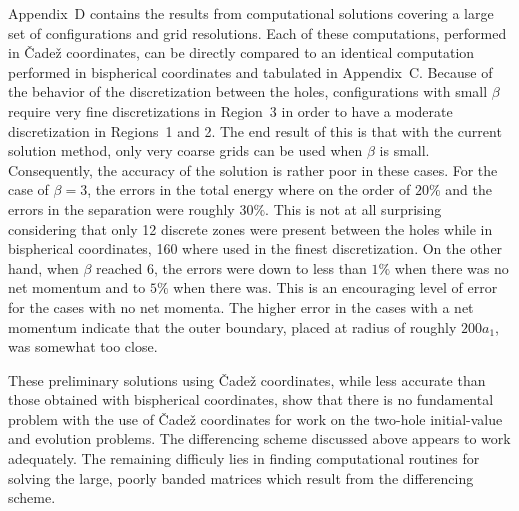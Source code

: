Appendix~D contains the results from computational solutions covering a large set
of configurations and grid resolutions.  Each of these computations, performed in
\v{C}ade\v{z} coordinates, can be directly compared to an identical computation
performed in bispherical coordinates and tabulated in Appendix~C.  Because of
the behavior of the discretization between the holes, configurations with small
$\beta$ require very fine discretizations in Region~3 in order to have a
moderate discretization in Regions~1 and 2.  The end result of this is that
with the current solution method, only very coarse grids can be used when
$\beta$ is small.  Consequently, the accuracy of the solution is rather poor in
these cases.  For the case of $\beta=3$, the errors in the total energy where
on the order of $20\%$ and the errors in the separation were roughly $30\%$. 
This is not at all surprising considering that only 12 discrete zones were
present between the holes while in bispherical coordinates, 160 where used in
the finest discretization.  On the other hand, when $\beta$ reached 6, the errors
were down to less than $1\%$ when there was no net momentum and to $5\%$ when
there was.  This is an encouraging level of error for the cases with no net
momenta.  The higher error in the cases with a net momentum indicate that the
outer boundary, placed at radius of roughly $200a_1$, was somewhat too close.

These preliminary solutions using \v{C}ade\v{z} coordinates, while less accurate
than those obtained with bispherical coordinates, show that there is no
fundamental problem with the use of \v{C}ade\v{z} coordinates for work on the
two-hole initial-value and evolution problems.  The differencing scheme
discussed above appears to work adequately.  The remaining difficuly lies in
finding computational routines for solving the large, poorly banded matrices
which result from the differencing scheme.

\vfill
\eject

